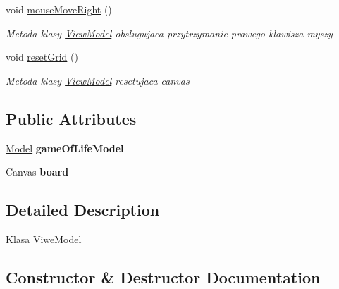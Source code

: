 \begin{DoxyCompactItemize}
void \mbox{\hyperlink{class_game_of_life_1_1_view_model_a3640ee71bf2210d1205725acc4f8180f}{mouse\+Move\+Right}} ()
\begin{DoxyCompactList}\small\item\em Metoda klasy \mbox{\hyperlink{class_game_of_life_1_1_view_model}{View\+Model}} obslugujaca przytrzymanie prawego klawisza myszy \end{DoxyCompactList}\item 
void \mbox{\hyperlink{class_game_of_life_1_1_view_model_a531b06fc7461978e79d78314bcb4c25d}{reset\+Grid}} ()
\begin{DoxyCompactList}\small\item\em Metoda klasy \mbox{\hyperlink{class_game_of_life_1_1_view_model}{View\+Model}} resetujaca canvas \end{DoxyCompactList}\end{DoxyCompactItemize}
\subsection*{Public Attributes}
\begin{DoxyCompactItemize}
\item 
\mbox{\label{class_game_of_life_1_1_view_model_a4b73484756a2e5b68e9e5b6a336e3cc3}} 
\mbox{\hyperlink{class_game_of_life_1_1_model}{Model}} {\bfseries game\+Of\+Life\+Model}
\item 
\mbox{\label{class_game_of_life_1_1_view_model_a43cd2306fec4d71b4acae967309f0a01}} 
Canvas {\bfseries board}
\end{DoxyCompactItemize}


\subsection{Detailed Description}
Klasa Viwe\+Model 



\subsection{Constructor \& Destructor Documentation}
\mbox{\label{class_game_of_life_1_1_view_model_afaabd55bb1450e02f4c7a1fa02e796ed}} 
